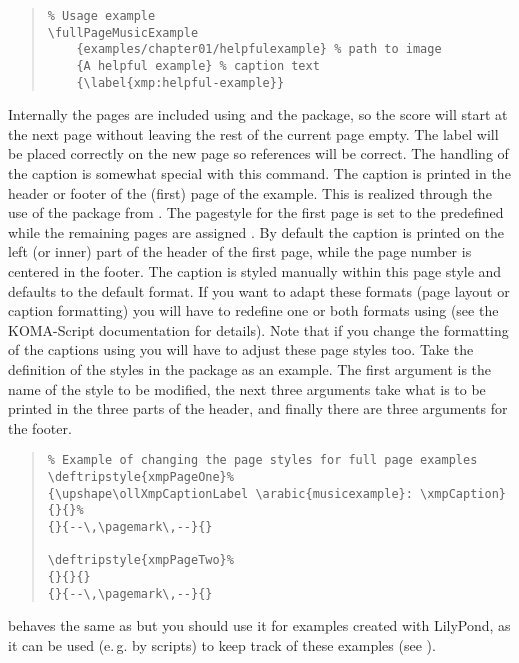 \documentclass[../openLilyLib]{subfiles}
\begin{document}
\begin{quote}
\begin{verbatim}
% Usage example
\fullPageMusicExample
    {examples/chapter01/helpfulexample} % path to image
    {A helpful example} % caption text
    {\label{xmp:helpful-example}}
\end{verbatim}
\end{quote}
Internally the pages are included using  and the  package, so the score will start at the next page without leaving the rest of the current page empty.
The label will be placed correctly on the new page so references will be correct.
The handling of the caption is somewhat special with this command.
The caption is printed in the header or footer of the (first) page of the example.
This is realized through the use of the  package from .
The pagestyle for the first page is set to the predefined  while the remaining pages are assigned .
By default the caption is printed on the left (or inner) part of the header of the first page, while the page number is centered in the footer.
The caption is styled manually within this page style and defaults to the default  format.
If you want to adapt these formats (page layout or caption formatting) you will have to redefine one or both formats using  (see the KOMA-Script documentation for details).
Note that if you change the formatting of the captions using  you will have to adjust these page styles too.
Take the definition of the styles in the package as an example.
The first argument is the name of the style to be modified, the next three arguments take what is to be printed in the three parts of the header, and finally there are three arguments for the footer.
\begin{quote}
\begin{verbatim}
% Example of changing the page styles for full page examples
\deftripstyle{xmpPageOne}%
{\upshape\ollXmpCaptionLabel \arabic{musicexample}: \xmpCaption}{}{}%
{}{--\,\pagemark\,--}{}

\deftripstyle{xmpPageTwo}%
{}{}{}
{}{--\,\pagemark\,--}{}

\end{verbatim}
\end{quote}

 behaves the same as  but you should use it for examples created with LilyPond, as it can be used (e.\,g. by scripts) to keep track of these examples (see ).
\end{document}
